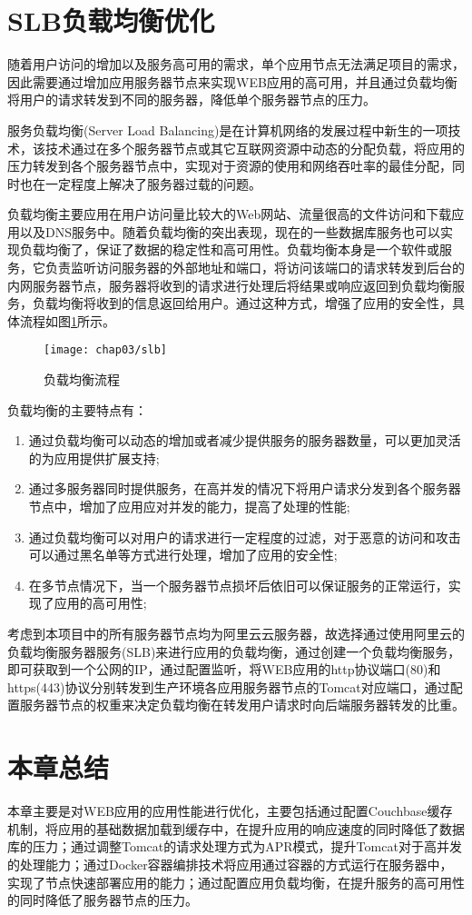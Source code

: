 \section{SLB负载均衡优化}

随着用户访问的增加以及服务高可用的需求，单个应用节点无法满足项目的需求，因此需要通过增加应用服务器节点来实现WEB应用的高可用，并且通过负载均衡将用户的请求转发到不同的服务器，降低单个服务器节点的压力。

服务负载均衡(Server Load Balancing)是在计算机网络的发展过程中新生的一项技术，该技术通过在多个服务器节点或其它互联网资源中动态的分配负载，将应用的压力转发到各个服务器节点中，实现对于资源的使用和网络吞吐率的最佳分配，同时也在一定程度上解决了服务器过载的问题\cite{负载均衡计算机}。

负载均衡主要应用在用户访问量比较大的Web网站、流量很高的文件访问和下载应用以及DNS服务中。随着负载均衡的突出表现，现在的一些数据库服务也可以实现负载均衡了，保证了数据的稳定性和高可用性。负载均衡本身是一个软件或服务，它负责监听访问服务器的外部地址和端口，将访问该端口的请求转发到后台的内网服务器节点，服务器将收到的请求进行处理后将结果或响应返回到负载均衡服务，负载均衡将收到的信息返回给用户\cite{wei2010system}。通过这种方式，增强了应用的安全性，具体流程如图\ref{fig:slb}所示。

\begin{figure}[H] %
  \centering
  \texttt{[image: chap03/slb]}
  \caption{负载均衡流程}
  \label{fig:slb}
\end{figure}

负载均衡的主要特点有：
\begin{enumerate}
\item 通过负载均衡可以动态的增加或者减少提供服务的服务器数量，可以更加灵活的为应用提供扩展支持;
\item 通过多服务器同时提供服务，在高并发的情况下将用户请求分发到各个服务器节点中，增加了应用应对并发的能力，提高了处理的性能;
\item 通过负载均衡可以对用户的请求进行一定程度的过滤，对于恶意的访问和攻击可以通过黑名单等方式进行处理，增加了应用的安全性;
\item 在多节点情况下，当一个服务器节点损坏后依旧可以保证服务的正常运行，实现了应用的高可用性;
\end{enumerate}

考虑到本项目中的所有服务器节点均为阿里云云服务器，故选择通过使用阿里云的负载均衡服务器服务(SLB)来进行应用的负载均衡，通过创建一个负载均衡服务，即可获取到一个公网的IP，通过配置监听，将WEB应用的http协议端口(80)和https(443)协议分别转发到生产环境各应用服务器节点的Tomcat对应端口，通过配置服务器节点的权重来决定负载均衡在转发用户请求时向后端服务器转发的比重。

\section{本章总结}
本章主要是对WEB应用的应用性能进行优化，主要包括通过配置Couchbase缓存机制，将应用的基础数据加载到缓存中，在提升应用的响应速度的同时降低了数据库的压力；通过调整Tomcat的请求处理方式为APR模式，提升Tomcat对于高并发的处理能力；通过Docker容器编排技术将应用通过容器的方式运行在服务器中，实现了节点快速部署应用的能力；通过配置应用负载均衡，在提升服务的高可用性的同时降低了服务器节点的压力。
